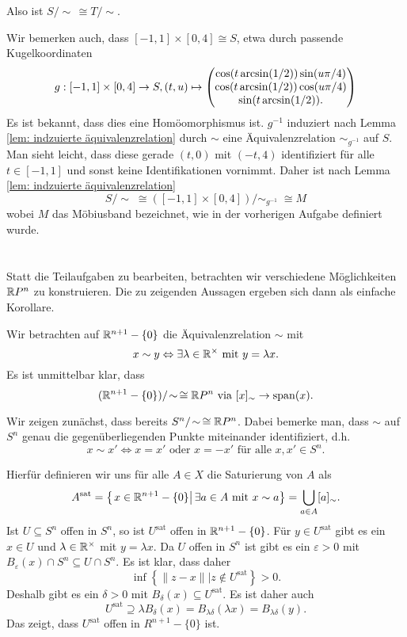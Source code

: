 \documentclass[a4paper,10pt]{article}
\begin{document}
Also ist $S/\!\sim\, \cong T/\!\sim$.

Wir bemerken auch, dass $[-1,1] \times [0,4] \cong S$, etwa durch passende Kugelkoordinaten
\[
 g : [-1,1] \times [0,4] \to S, (t,u) \mapsto
 \begin{pmatrix}
  \cos(t \arcsin(1/2)) \sin(u \pi/4) \\
  \cos(t \arcsin(1/2)) \cos(u \pi/4) \\
  \sin(t \arcsin(1/2)).
 \end{pmatrix}
\]
Es ist bekannt, dass dies eine Homöomorphismus ist. $g^{-1}$ induziert nach Lemma \ref{lem: indzuierte äquivalenzrelation} durch $\sim$ eine Äquivalenzrelation $\sim_{g^{-1}}$ auf $S$. Man sieht leicht, dass diese gerade $(t,0)$ mit $(-t,4)$ identifiziert für alle $t \in [-1,1]$ und sonst keine Identifikationen vornimmt. Daher ist nach Lemma \ref{lem: indzuierte äquivalenzrelation}
\[
 S/\!\sim\; \cong ([-1,1] \times [0,4])/\!\sim_{g^{-1}}\; \cong M
\]
wobei $M$ das Möbiusband bezeichnet, wie in der vorherigen Aufgabe definiert wurde.





\section{}
Statt die Teilaufgaben zu bearbeiten, betrachten wir verschiedene Möglichkeiten $\mathbb{R} P^n$ zu konstruieren. Die zu zeigenden Aussagen ergeben sich dann als einfache Korollare.

Wir betrachten auf $\mathbb{R}^{n+1} - \{0\}$ die Äquivalenzrelation $\sim$ mit
\[
 x \sim y \Leftrightarrow \exists \lambda \in \mathbb{R}^\times \text{ mit } y = \lambda x.
\]
Es ist unmittelbar klar, dass
\[
 (\mathbb{R}^{n+1} - \{0\})/\!\sim\, \cong \mathbb{R} P^n \text{ via } [x]_\sim \to \operatorname{span}(x).
\]

Wir zeigen zunächst, dass bereits $S^n/\!\sim\, \cong \mathbb{R} P^n$. Dabei bemerke man, dass $\sim$ auf $S^n$ genau die gegenüberliegenden Punkte miteinander identifiziert, d.h.
\[
 x \sim x' \Leftrightarrow x = x' \text{ oder } x = -x' \text{ für alle } x,x' \in S^n.
\]

Hierfür definieren wir uns für alle $A \in X$ die Saturierung von $A$ als
\[
 A^{\text{sat}}
 = \left\{\left. x \in \mathbb{R}^{n+1} - \{0\} \right| \exists a \in A \text{ mit } x \sim a\right\}
 = \bigcup_{a \in A} [a]_\sim.
\]
Ist $U \subseteq S^n$ offen in $S^n$, so ist $U^{\text{sat}}$ offen in $\mathbb{R}^{n+1} - \{0\}$. Für $y \in U^{\text{sat}}$ gibt es ein $x \in U$ und $\lambda \in \mathbb{R}^\times$ mit $y = \lambda x$. Da $U$ offen in $S^n$ ist gibt es ein $\varepsilon > 0$ mit $B_\varepsilon(x) \cap S^n \subseteq U \cap S^n$. Es ist klar, dass daher
\[
 \inf \left\{\|z-x\| | z \not\in U^{\text{sat}}\right\} > 0.
\]
Deshalb gibt es ein $\delta > 0$ mit $B_\delta(x) \subseteq U^{\text{sat}}$. Es ist daher auch
\[
 U^{\text{sat}} \supseteq \lambda B_\delta(x) = B_{\lambda \delta}(\lambda x) = B_{\lambda \delta}(y).
\]
Das zeigt, dass $U^{\text{sat}}$ offen in $R^{n+1} - \{0\}$ ist.
\end{document}
